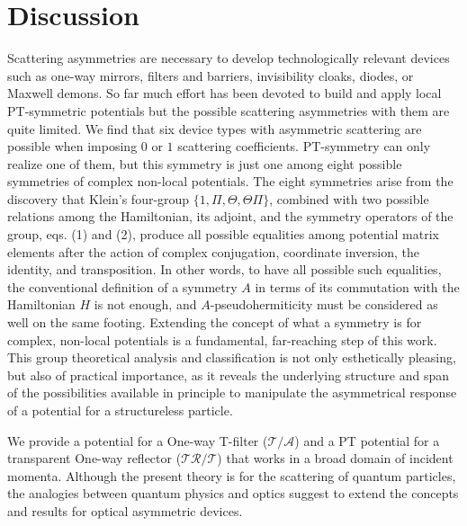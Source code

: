 \section{Discussion\label{sec:chapter1_Discussion}}
%
%
Scattering asymmetries are necessary to develop technologically relevant devices such
as one-way mirrors, filters and  barriers, invisibility cloaks, diodes, or Maxwell demons.
So far much effort has been devoted to build and apply local PT-symmetric potentials but the possible scattering asymmetries with them are
quite limited. We find that six  device types with asymmetric scattering are possible
when imposing $0$ or $1$ scattering coefficients.
PT-symmetry can only realize one of them, but this symmetry  is just one among eight possible symmetries of complex non-local potentials.
The eight symmetries arise from the discovery that Klein's four-group
$\{1, \Pi, \Theta, \Theta\Pi\}$, combined with two possible relations among the Hamiltonian, its adjoint,
and the symmetry operators of the group, eqs. (1) and (2),
produce all possible  equalities among potential matrix elements after the action of complex conjugation, coordinate inversion, the identity, and transposition.
In other words, to have all possible such equalities, the conventional definition of a symmetry $A$ in terms of its commutation with the Hamiltonian $H$ is not enough, and $A$-pseudohermiticity must be considered as well on the same footing.
Extending the concept of what a symmetry is for complex, non-local potentials is
a fundamental, far-reaching step of this work.
This group theoretical analysis and classification is not only esthetically pleasing, but also of practical importance, as it reveals
the underlying structure and span of the possibilities available in principle to manipulate the asymmetrical response of a potential
for a structureless particle.

We provide a potential for a One-way T-filter ($\mathcal{T}/\mathcal{A}$) and a PT potential for a transparent One-way reflector ($\mathcal{T}\mathcal{R}/\mathcal{T}$) that works in a broad domain of incident momenta. Although the present theory is for the scattering of quantum particles, the analogies between quantum physics and optics suggest to extend the concepts and results for optical asymmetric devices.
%
